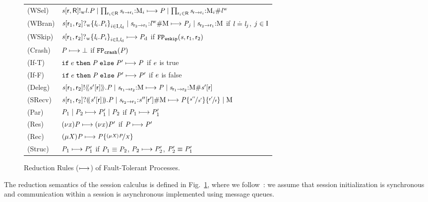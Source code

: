 \begin{figure}[tp]
\begin{tabular}{ll}
		(\textsf{WSel}) & $ \PSelW{\Chan}{\Role}{\Role[R]}{\Label}{\PT} \mid \prod_{\Role_i \in \Role[R]} \MQ{\Chan}{\Role}{\Role_i}{\Queue_i} \step \PT \mid \prod_{\Role_i \in \Role[R]} \MQ{\Chan}{\Role}{\Role_i}{\Queue_i\#\MessBW{\Label}} $\\
		(\textsf{WBran}) & $ \PBranW{\Chan}{\Role_1}{\Role_2}{\Set{ \Label_i.\PT_i }_{i \in \indexSet, \LabelD}} \mid \MQ{\Chan}{\Role_2}{\Role_1}{\MessBW{\Label}\#\Queue} \step \PT_j \mid \MQ{\Chan}{\Role_2}{\Role_1}{\Queue} $ \hfill if $ \Label \compL \Label_j $, $ j \in \indexSet $\\
		(\textsf{WSkip}) & $ \PBranW{\Chan}{\Role_1}{\Role_2}{\Set{ \Label_i.\PT_i }_{i \in \indexSet, \LabelD}} \step \PTD $ \hfill if $ \fpWSkip(\Chan, \Role_1, \Role_2) $\\
		(\textsf{Crash}) & $ \PT \step \PCrash $ \hfill if $ \fpCrash(\PT) $\\
        (\textsf{If-T}) & $ \PITE{\Expr}{\PT}{\PT'} \step \PT $ \hspace{15em} if $ \Expr $ is true\\
		(\textsf{If-F}) & $ \PITE{\Expr}{\PT}{\PT'} \step \PT' $ \hfill if $ \Expr $ is false\\
		(\textsf{Deleg}) & $ \PDelA{\Chan}{\Role_1}{\Role_2}{\AT{\Chan'}{\Role}}{\PT} \mid \MQ{\Chan}{\Role_1}{\Role_2}{\Queue} \step \PT \mid \MQ{\Chan}{\Role_1}{\Role_2}{\Queue\#\AT{\Chan'}{\Role}} $\\
		(\textsf{SRecv}) & $ \PDelB{\Chan}{\Role_1}{\Role_2}{\AT{\Chan'}{\Role}}{\PT} \mid \MQ{\Chan}{\Role_2}{\Role_1}{\AT{\Chan''}{\Role'}\#\Queue} \step \PT\Subst{\Chan''}{\Chan'}\Subst{\Role'}{\Role} \mid \Queue $\\
		(\textsf{Par}) & $ \PT_1 \mid \PT_2 \step \PT_1' \mid \PT_2 $ \hfill if $ \PT_1 \step \PT_1' $\\
		(\textsf{Res}) & $ \PRes{\Args}{\PT} \step \PRes{\Args}{\PT'} $ \hfill if $ \PT \step \PT' $\\
		(\textsf{Rec}) & $ \PRep{\ProcV}{\PT} \step \PT\Subst{\PRep{\ProcV}{\PT}}{\ProcV} $\\
		(\textsf{Struc}) & $ \PT_1 \step \PT_1' $ \hfill if $ \PT_1 \equiv \PT_2 $, $ \PT_2 \step \PT_2' $, $ \PT_2' \equiv \PT_1' $
	\end{tabular}
	\vspace*{-0.5em}
	\caption{Reduction Rules ($ \step $) of Fault-Tolerant Processes.}
	\label{fig:semantics}
\end{figure}

The reduction semantics of the session calculus is defined in Fig.~\ref{fig:semantics}, where we follow~\cite{hondaYoshidaCarbone16}: we assume that session initialization is synchronous and communication within a session is asynchronous implemented using message queues.


